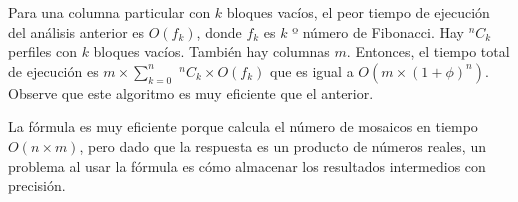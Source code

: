 Para una columna particular con \(k\) bloques vacíos, el peor tiempo de ejecución del análisis anterior es \(O(f_{k})\), donde \(f_{k}\) es \(k\) º número de Fibonacci. Hay \(^{n}C_{k}\) perfiles con \(k\) bloques vacíos. También hay columnas \(m\). Entonces, el tiempo total de ejecución es \(m \times \sum_{k = 0}^{n}\) \(^{n}C_{k} \times O(f_{k})\) que es igual a \(O(m \times (1+ \phi)^n)\). Observe que este algoritmo es muy eficiente que el anterior.

La fórmula es muy eficiente porque calcula el número de mosaicos en tiempo $O(n\times m)$, pero dado que la respuesta es un producto de números reales, un problema al usar la fórmula es cómo almacenar los resultados intermedios con precisión.